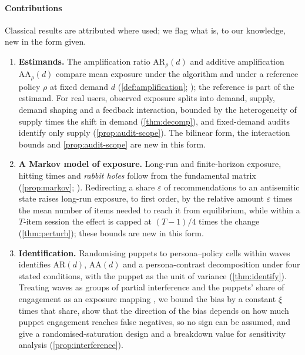 \paragraph{Contributions}
Classical results are attributed where used; we flag what is, to our
knowledge, new in the form given.
\begin{enumerate}[label=\textbf{C\arabic*},ref=C\arabic*,leftmargin=2.4em,itemsep=2pt]
  \item\label{contrib:estimands} \textbf{Estimands.} The amplification ratio
  $\mathrm{AR}_\rho(d)$ and additive amplification $\mathrm{AA}_\rho(d)$
  compare mean exposure under the algorithm and under a reference policy
  $\rho$ at fixed demand $d$ (\cref{def:amplification};
  \citealp{rubin1974,imbensrubin2015}); the reference is part of the
  estimand. For real users, observed exposure splits into demand, supply,
  demand shaping and a feedback interaction, bounded by the heterogeneity of
  supply times the shift in demand (\cref{thm:decomp}), and fixed-demand
  audits identify only supply (\cref{prop:audit-scope}). The bilinear form,
  the interaction bounds and \cref{prop:audit-scope} are new in this form.
  \item\label{contrib:markov} \textbf{A Markov model of exposure.} Long-run
  and finite-horizon exposure, hitting times and \emph{rabbit holes} follow
  from the fundamental matrix (\cref{prop:markov};
  \citealp{kemeny1960,meyer1975}). Redirecting a share $\varepsilon$ of
  recommendations to an antisemitic state raises long-run exposure, to first
  order, by the relative amount $\varepsilon$ times the mean number of items
  needed to reach it from equilibrium, while within a $T$-item session the
  effect is capped at $(T-1)/4$ times the change (\cref{thm:perturb}); these
  bounds are new in this form.
  \item\label{contrib:identify} \textbf{Identification.} Randomising puppets
  to persona--policy cells within waves identifies $\mathrm{AR}(d)$,
  $\mathrm{AA}(d)$ and a persona-contrast decomposition under four stated
  conditions, with the puppet as the unit of variance (\cref{thm:identify}).
  Treating waves as groups of partial interference \citep{hudgens2008} and the
  puppets' share of engagement as an exposure mapping \citep{aronow2017}, we
  bound the bias by a constant $\xi$ times that share, show that the direction
  of the bias depends on how much puppet engagement reaches false negatives,
  so no sign can be assumed, and give a randomised-saturation design and a
  breakdown value for sensitivity analysis (\cref{prop:interference}).

\end{enumerate}
